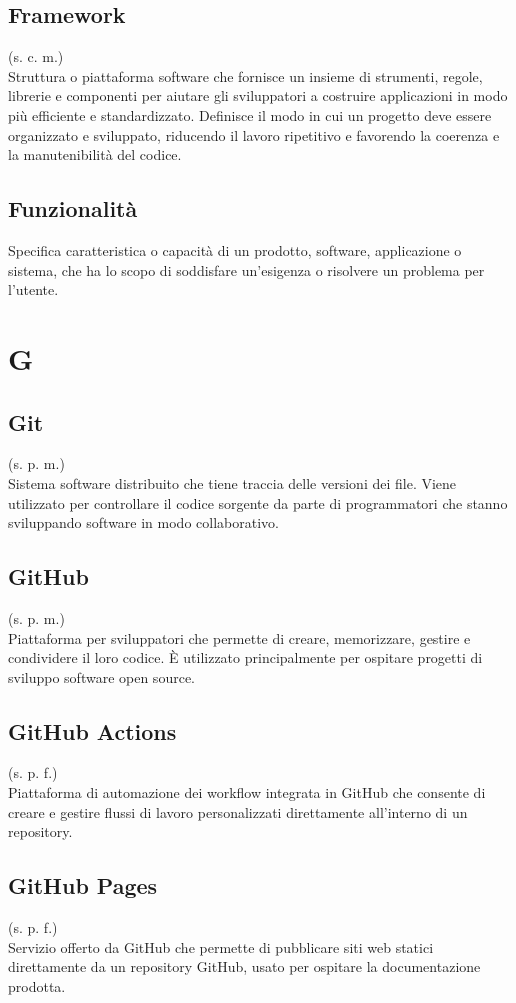     \subsection{Framework}
    (s. c. m.)\\
    Struttura o piattaforma software che fornisce un insieme di strumenti, regole, 
    librerie e componenti per aiutare gli sviluppatori a costruire applicazioni 
    in modo più efficiente e standardizzato. Definisce il modo in cui un progetto 
    deve essere organizzato e sviluppato, riducendo il lavoro ripetitivo e favorendo 
    la coerenza e la manutenibilità del codice.
    \subsection{Funzionalità}
    \label{Funzionalità}
    Specifica caratteristica o capacità di un prodotto, software, applicazione o sistema, 
    che ha lo scopo di soddisfare un'esigenza o risolvere un problema per l'utente.
\pagebreak
\section{G}
    \subsection{Git}
    \label{Git}
    (s. p. m.)\\
    Sistema software distribuito che tiene traccia delle versioni dei file. 
    Viene utilizzato per controllare il codice sorgente da parte di programmatori 
    che stanno sviluppando software in modo collaborativo.
    \subsection{GitHub}
    \label{GitHub}
    (s. p. m.)\\
    Piattaforma per sviluppatori che permette di creare, memorizzare, gestire 
    e condividere il loro codice. È utilizzato principalmente per ospitare 
    progetti di sviluppo software open source.
    \subsection{GitHub Actions}
    \label{GitHub Actions}
    (s. p. f.)\\
    Piattaforma di automazione dei workflow integrata in GitHub che consente 
    di creare e gestire flussi di lavoro personalizzati direttamente all'interno 
    di un repository.
    \subsection{GitHub Pages}
    \label{GitHub Pages}
    (s. p. f.)\\
    Servizio offerto da GitHub che permette di pubblicare siti web statici direttamente da un repository GitHub,
    usato per ospitare la documentazione prodotta.
